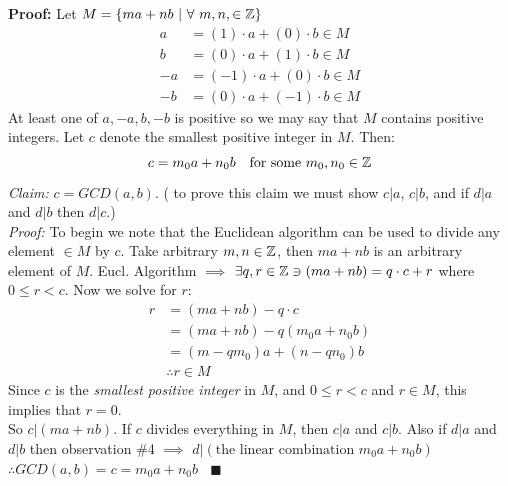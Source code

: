 \begin{lemma}
\noindent\textbf{Proof:} Let $M= \{ma+nb \ | \ \forall \ m,n,\in {\mathbb{ Z}} \}$
\begin{align}
a&=(1)\cdot a + (0)\cdot b \in M \nonumber \\
b&=(0)\cdot a + (1)\cdot b \in M\nonumber \\
-a&=(-1)\cdot a + (0)\cdot b \in M\nonumber \\
-b&=(0)\cdot a + (-1)\cdot b \in M\nonumber 
\end{align}
At least one of $a,-a,b,-b$ is positive so we may say that $M$ contains positive integers. Let $c$ denote the smallest positive integer in $M$. Then:\\
\begin{equation}
    c=m_0 a +n_0 b \ \ \text{ for some } m_0,n_0\in {\mathbb{ Z}} \nonumber
\end{equation}
\textit{Claim:} $c=GCD(a,b)$. ( to prove this claim we must show $c|a$, $c|b$, and if $d|a$ and $d|b$ then $d|c$.)\\
\textit{Proof:} To begin we note that the Euclidean algorithm can be used to divide any element $\in M$ by $c$. Take arbitrary $m,n \in {\mathbb{ Z}}$, then $ma+nb$ is an arbitrary element of $M$. Eucl. Algorithm $\implies$ $\exists q,r \in {\mathbb{ Z}}\ni (ma+nb)=q\cdot c + r$ where $0\leq r < c$. Now we solve for $r$:
\begin{align}
    r&= (ma+nb)-q\cdot c \nonumber\\
    &= (ma+nb)-q(m_0a +n_0 b) \nonumber\\
    &= (m-qm_0)a+(n- q n_0)b \nonumber\\
    &\therefore r\in M \nonumber
\end{align}
Since $c$ is the \textit{smallest positive integer} in $M$, and $0\leq r < c$ and $r\in M$, this implies that $r=0$.\steezybreak\\
So $c|(ma+nb)$. If $c$ divides everything in $M$, then $c|a$ and $c|b$. Also if $d|a$ and $d|b$ then observation \#4 $\implies$ $d|(\text{the linear combination } m_0a+n_0b)$\steezybreak\\
$\therefore GCD(a,b)=c=m_0a+n_0b \ \ \ \ \blacksquare$\steezybreak\\
\end{lemma}


